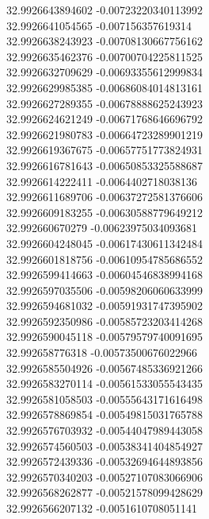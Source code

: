 {32.9926643894602	-0.00723220340113992\\
32.9926641054565	-0.007156357619314\\
32.9926638243923	-0.00708130667756162\\
32.9926635462376	-0.00700704225811525\\
32.9926632709629	-0.00693355612999834\\
32.9926629985385	-0.00686084014813161\\
32.9926627289355	-0.00678888625243923\\
32.9926624621249	-0.00671768646696792\\
32.9926621980783	-0.00664723289901219\\
32.9926619367675	-0.00657751773824931\\
32.9926616781643	-0.00650853325588687\\
32.9926614222411	-0.0064402718038136\\
32.9926611689706	-0.00637272581376606\\
32.9926609183255	-0.00630588779649212\\
32.992660670279	-0.00623975034093681\\
32.9926604248045	-0.00617430611342484\\
32.9926601818756	-0.00610954785686552\\
32.9926599414663	-0.00604546838994168\\
32.9926597035506	-0.00598206060633999\\
32.9926594681032	-0.00591931747395902\\
32.9926592350986	-0.00585723203414268\\
32.9926590045118	-0.00579579740091695\\
32.992658776318	-0.00573500676022966\\
32.9926585504926	-0.00567485336921266\\
32.9926583270114	-0.00561533055543435\\
32.9926581058503	-0.00555643171616498\\
32.9926578869854	-0.00549815031765788\\
32.9926576703932	-0.00544047989443058\\
32.9926574560503	-0.00538341404854927\\
32.9926572439336	-0.00532694644893856\\
32.9926570340203	-0.00527107083066906\\
32.9926568262877	-0.00521578099428629\\
32.9926566207132	-0.0051610708051141\\
}
